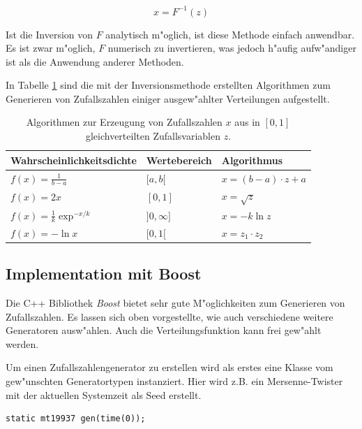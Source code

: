 \begin{refsection}
\begin{equation}
	x = F^{-1}(z)
\end{equation}

Ist die Inversion von $F$ analytisch m"oglich, ist diese Methode einfach
anwendbar. Es ist zwar m"oglich, $F$ numerisch zu invertieren, was jedoch
h"aufig aufw"andiger ist als die Anwendung anderer Methoden.

In Tabelle \ref{tab:verteilungen_erzeugen} sind die mit der
Inversionsmethode erstellten Algorithmen zum Generieren von Zufallszahlen
einiger ausgew"ahlter Verteilungen aufgestellt.

\begin{table}[htbp]
	\centering
	\renewcommand{\arraystretch}{1.5}
	\begin{tabular}{|l|l|l|}
		\hline
		Wahrscheinlichkeitsdichte & Wertebereich & Algorithmus \\ \hline
		$f(x) = \frac{1}{b-a}$ & $[a,b[$ & $x = (b-a) \cdot z + a$ \\ \hline
		$f(x) = 2x$ & $[0,1]$ & $x = \sqrt{z}$ \\ \hline
		$f(x) = \frac{1}{k} \exp^{-x/k}$ & $]0,\infty]$ & $x = -k \ln z$ \\ \hline
		$f(x) = - \ln x$ & $[0,1[$ & $x = z_1 \cdot z_2$ \\ \hline
	\end{tabular}
	\caption{Algorithmen zur Erzeugung von Zufallszahlen $x$ aus in $[0,1]$ gleichverteilten Zufallsvariablen $z$.}
	\label{tab:verteilungen_erzeugen}
	\renewcommand{\arraystretch}{1.0}
\end{table}

\subsection{Implementation mit Boost}
Die C++ Bibliothek \textit{Boost} bietet sehr gute M"oglichkeiten zum
Generieren von Zufallszahlen. Es lassen sich oben vorgestellte, wie auch
verschiedene weitere Generatoren ausw"ahlen. Auch die Verteilungsfunktion
kann frei gew"ahlt werden.

Um einen Zufallszahlengenerator zu erstellen wird als erstes eine
Klasse vom gew"unschten Generatortypen instanziert. Hier wird z.B. ein
Mersenne-Twister mit der aktuellen Systemzeit als Seed erstellt.

\begin{lstlisting}[style=C]
static mt19937 gen(time(0));
\end{lstlisting}


\end{refsection}

